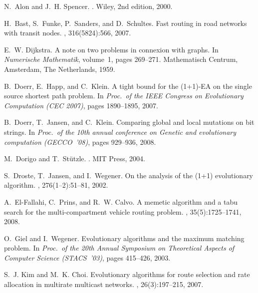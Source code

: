 \documentclass{sig-alternate}
\begin{document}
\begin{thebibliography}{10}

N.~Alon and J.~H. Spencer.
.
\newblock Wiley, 2nd edition, 2000.

H.~Bast, S.~Funke, P.~Sanders, and D.~Schultes.
\newblock Fast routing in road networks with transit nodes.
, 316(5824):566, 2007.

E.~W. Dijkstra.
\newblock A note on two problems in connexion with graphs.
\newblock In {\em Numerische Mathematik}, volume~1, pages 269--271.
  Mathematisch Centrum, Amsterdam, The Netherlands, 1959.

B.~Doerr, E.~Happ, and C.~Klein.
\newblock A tight bound for the {(1+1)-EA} on the single source shortest path
  problem.
\newblock In {\em Proc.\ of the IEEE Congress on Evolutionary Computation (CEC
  2007)}, pages 1890--1895, 2007.

B.~Doerr, T.~Jansen, and C.~Klein.
\newblock Comparing global and local mutations on bit strings.
\newblock In {\em Proc.\ of the 10th annual conference on Genetic and
  evolutionary computation (GECCO~'08)}, pages 929--936, 2008.

M.~Dorigo and T.~St{\"u}tzle.
.
\newblock MIT Press, 2004.

S.~Droste, T.~Jansen, and I.~Wegener.
\newblock On the analysis of the (1+1) evolutionary algorithm.
, 276(1--2):51--81, 2002.

A.~El-Fallahi, C.~Prins, and R.~W. Calvo.
\newblock A memetic algorithm and a tabu search for the multi-compartment
  vehicle routing problem.
, 35(5):1725--1741, 2008.

O.~Giel and I.~Wegener.
\newblock Evolutionary algorithms and the maximum matching problem.
\newblock In {\em Proc.\ of the 20th Annual Symposium on Theoretical Aspects of
  Computer Science (STACS~'03)}, pages 415--426, 2003.

S.~J. Kim and M.~K. Choi.
\newblock Evolutionary algorithms for route selection and rate allocation in
  multirate multicast networks.
, 26(3):197--215, 2007.


\end{thebibliography}
\end{document}
